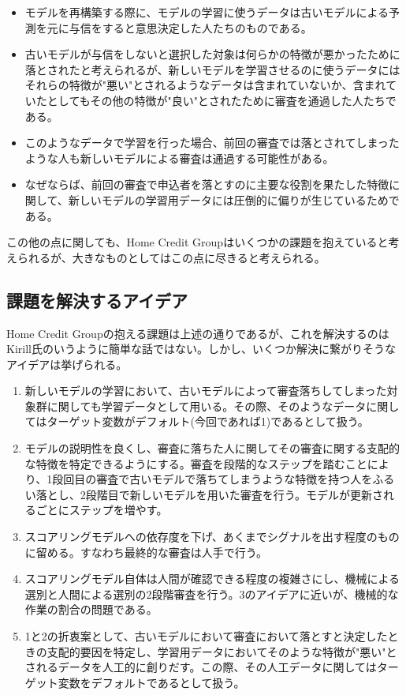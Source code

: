 \documentclass[11pt]{jsarticle}
\providecommand{\tightlist}{%
      \setlength{\itemsep}{0pt}\setlength{\parskip}{0pt}}
\begin{document}
\begin{itemize}
\tightlist
\item
  モデルを再構築する際に、モデルの学習に使うデータは古いモデルによる予測を元に与信をすると意思決定した人たちのものである。
\item
  古いモデルが与信をしないと選択した対象は何らかの特徴が悪かったために落とされたと考えられるが、新しいモデルを学習させるのに使うデータにはそれらの特徴が"悪い"とされるようなデータは含まれていないか、含まれていたとしてもその他の特徴が"良い"とされたために審査を通過した人たちである。
\item
  このようなデータで学習を行った場合、前回の審査では落とされてしまったような人も新しいモデルによる審査は通過する可能性がある。
\item
  なぜならば、前回の審査で申込者を落とすのに主要な役割を果たした特徴に関して、新しいモデルの学習用データには圧倒的に偏りが生じているためである。
\end{itemize}

この他の点に関しても、Home Credit
Groupはいくつかの課題を抱えていると考えられるが、大きなものとしてはこの点に尽きると考えられる。

    \subsection{課題を解決するアイデア}\label{ux8ab2ux984cux3092ux89e3ux6c7aux3059ux308bux30a2ux30a4ux30c7ux30a2}

    Home Credit
Groupの抱える課題は上述の通りであるが、これを解決するのはKirill氏のいうように簡単な話ではない。しかし、いくつか解決に繋がりそうなアイデアは挙げられる。

\begin{enumerate}
\def\labelenumi{\arabic{enumi}.}
\tightlist
\item
  新しいモデルの学習において、古いモデルによって審査落ちしてしまった対象群に関しても学習データとして用いる。その際、そのようなデータに関してはターゲット変数がデフォルト(今回であれば1)であるとして扱う。
\item
  モデルの説明性を良くし、審査に落ちた人に関してその審査に関する支配的な特徴を特定できるようにする。審査を段階的なステップを踏むことにより、1段回目の審査で古いモデルで落ちてしまうような特徴を持つ人をふるい落とし、2段階目で新しいモデルを用いた審査を行う。モデルが更新されるごとにステップを増やす。
\item
  スコアリングモデルへの依存度を下げ、あくまでシグナルを出す程度のものに留める。すなわち最終的な審査は人手で行う。
\item
  スコアリングモデル自体は人間が確認できる程度の複雑さにし、機械による選別と人間による選別の2段階審査を行う。3のアイデアに近いが、機械的な作業の割合の問題である。
\item
  1と2の折衷案として、古いモデルにおいて審査において落とすと決定したときの支配的要因を特定し、学習用データにおいてそのような特徴が"悪い"とされるデータを人工的に創りだす。この際、その人工データに関してはターゲット変数をデフォルトであるとして扱う。
\end{enumerate}
\end{document}

